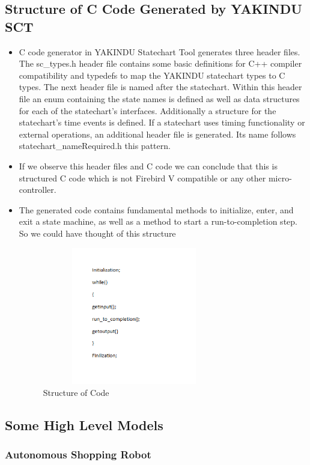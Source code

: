 \documentclass[a4paper,12pt,oneside]{article}
\begin{document}
\subsection{Structure of C Code Generated by YAKINDU SCT }
\begin{itemize}
\item C code generator in YAKINDU Statechart Tool generates three header files. The {sc\_types.h} header file contains some basic definitions for C++ compiler compatibility and typedefs to map the YAKINDU statechart types to C types. The next header file is named after the statechart. Within this header file an enum containing the state names is defined as well as data structures for each of the statechart’s interfaces. Additionally a structure for the statechart’s time events is defined. If a statechart uses timing functionality or external operations, an additional header file is generated. Its name follows {statechart\_nameRequired.h} this pattern.
\item If we observe this header files and C code we can conclude that this is structured C code which is not Firebird V compatible or any other micro-controller.
\item The generated code contains fundamental methods to initialize, enter, and exit a state machine, as well as a method to start a run-to-completion step. So we could have thought of this structure
\begin{figure}[H]
\centering
\includegraphics[width=8cm,height=6cm]{khuspe.PNG}
\caption{Structure of Code}
\end{figure}
\end{itemize}
\newpage
\subsection{Some High Level Models}

\subsubsection{Autonomous Shopping Robot} 
\end{document}

